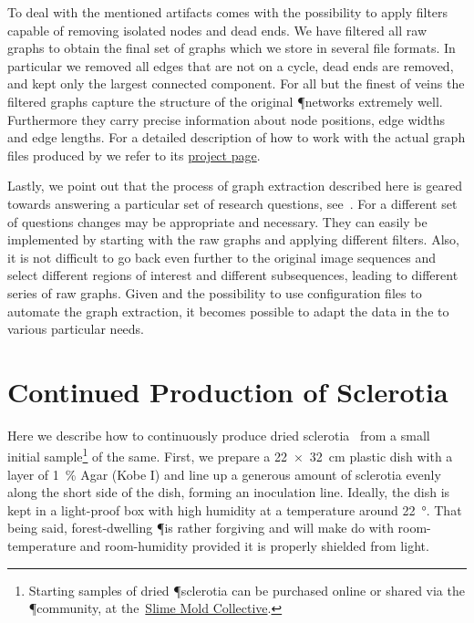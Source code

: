 		To deal with the mentioned artifacts \NEFI comes with the possibility to apply filters capable of removing isolated nodes and dead ends. We have filtered all raw graphs to obtain the final set of graphs which we store in several file formats. In particular we removed all edges that are not on a cycle, \ie dead ends are removed, and kept only the largest connected component. For all but the finest of veins the filtered graphs capture the structure of the original \P networks extremely well. Furthermore they carry precise information about node positions, edge widths and edge lengths. For a detailed description of how to work with the actual graph files produced by \NEFI we refer to its \href{http://nefi.mpi-inf.mpg.de}{project page}.

		Lastly, we point out that the process of graph extraction described here is geared towards answering a particular set of research questions, see~\cite{dirnberger2016}. For a different set of questions changes may be appropriate and necessary. They can easily be implemented by starting with the raw graphs and applying different filters. Also, it is not difficult to go back even further to the original image sequences and select different regions of interest and different subsequences, leading to different series of raw graphs. Given \NEFI and the possibility to use configuration files to automate the graph extraction, it becomes possible to adapt the data in the \data to various particular needs.

	\section{Continued Production of Sclerotia}\label{sec:sclerotia}

		Here we describe how to continuously produce dried sclerotia~\cite{lifecycle} from a small initial sample\footnote{Starting samples of dried \P sclerotia can be purchased online or shared via the \P community, \eg at the~\href{http://slimoco.ning.com/}{Slime Mold Collective}.} of the same. First, we prepare a \SI{22 x 32}{\centi\metre} plastic dish with a layer of \SI{1}{\percent} Agar (Kobe I) and line up a generous amount of sclerotia evenly along the short side of the dish, forming an inoculation line. Ideally, the dish is kept in a light-proof box with high humidity at a temperature around \SI{22}{\degree}. That being said, forest-dwelling \P is rather forgiving and will make do with room-temperature and room-humidity provided it is properly shielded from light.

